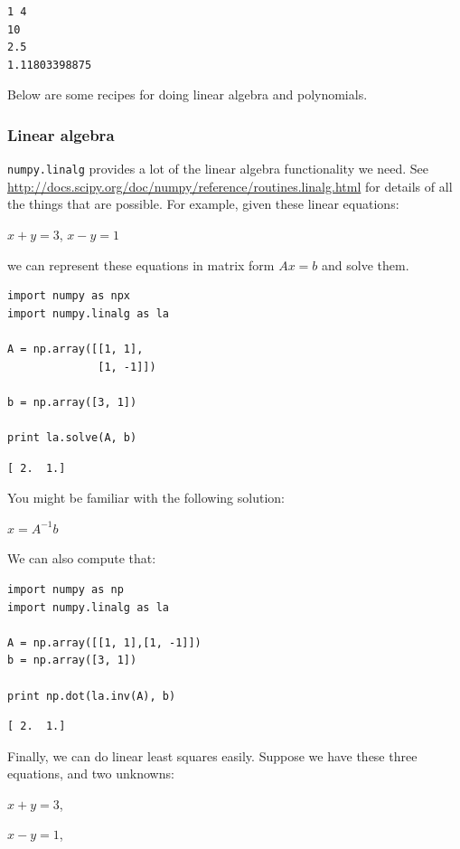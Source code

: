 \documentclass[11pt]{article}
\begin{document}
\begin{verbatim}
1 4
10
2.5
1.11803398875
\end{verbatim}


Below are some recipes for doing linear algebra and polynomials.


\subsubsection{Linear algebra}
\label{sec-3-11-2}
\texttt{numpy.linalg} provides a lot of the linear algebra functionality we need. See \url{http://docs.scipy.org/doc/numpy/reference/routines.linalg.html} for details of all the things that are possible. For example, given these linear equations:

$x + y = 3$, 
$x - y = 1$

we can represent these equations in matrix form $A x = b$ and solve them.

\begin{verbatim}
import numpy as npx
import numpy.linalg as la

A = np.array([[1, 1],
              [1, -1]])

b = np.array([3, 1])

print la.solve(A, b)
\end{verbatim}

\begin{verbatim}
[ 2.  1.]
\end{verbatim}

You might be familiar with the following solution:

$x = A^{-1} b$

We can also compute that:

\begin{verbatim}
import numpy as np
import numpy.linalg as la

A = np.array([[1, 1],[1, -1]])
b = np.array([3, 1])

print np.dot(la.inv(A), b)
\end{verbatim}

\begin{verbatim}
[ 2.  1.]
\end{verbatim}

Finally, we can do linear least squares easily. Suppose we have these three equations, and two unknowns:

$x + y = 3$,

$x - y = 1$,
\end{document}
